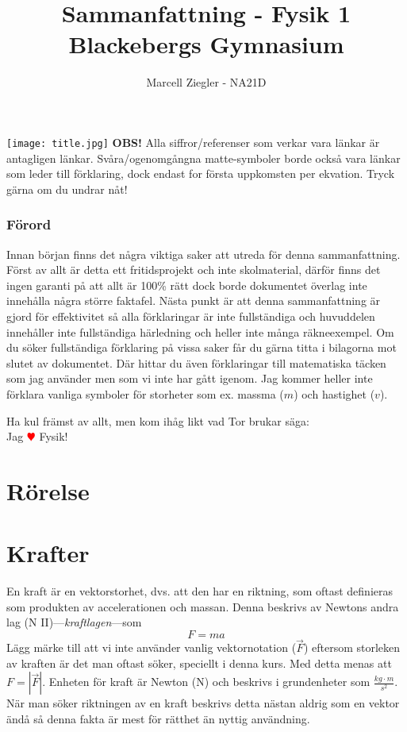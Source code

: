\documentclass[12pt, a4paper]{article}
\title{Sammanfattning - Fysik 1 \\ Blackebergs Gymnasium}
\author{Marcell Ziegler - NA21D}
\theoremstyle{definition}
\begin{document}
    \begin{titlepage}
        \maketitle
        \centering
        \vfill
        \texttt{[image: title.jpg]}
        \vfill
        \textbf{OBS!} Alla siffror/referenser som verkar vara länkar är antagligen länkar. Svåra/ogenomgångna matte-symboler borde också vara länkar som leder till förklaring, dock endast for första uppkomsten per ekvation. Tryck gärna om du undrar nåt!
    \end{titlepage}

    \tableofcontents

    \newpage

    \section*{Förord}
    Innan början finns det några viktiga saker att utreda för denna sammanfattning. Först av allt är detta ett fritidsprojekt och inte skolmaterial, därför finns det ingen garanti på att allt är 100\% rätt dock borde dokumentet överlag inte innehålla några större faktafel. Nästa punkt är att denna sammanfattning är gjord för effektivitet så alla förklaringar är inte fullständiga och huvuddelen innehåller inte fullständiga härledning och heller inte många räkneexempel. Om du söker fullständiga förklaring på vissa saker får du gärna titta i bilagorna mot slutet av dokumentet. Där hittar du även förklaringar till matematiska täcken som jag använder men som vi inte har gått igenom. Jag kommer heller inte förklara vanliga symboler för storheter som ex. massma ($m$) och hastighet ($v$).
    \begin{center}
        \large{Ha kul främst av allt, men kom ihåg likt vad Tor brukar säga:}\\
        \Large{Jag \textcolor{red}{$\varheartsuit$} Fysik!}
    \end{center}

    \part{Rörelse}
    

    \part{Krafter}
    En kraft är en vektorstorhet, dvs. att den har en riktning, som oftast definieras som produkten av accelerationen och massan. Denna beskrivs av Newtons andra lag (N II)---\emph{kraftlagen}---som
    \begin{equation*}
        F=ma
    \end{equation*}
    Lägg märke till att vi inte använder vanlig vektornotation ($\vec{F}$) eftersom storleken av kraften är det man oftast söker, speciellt i denna kurs. Med detta menas att $F = |\vec{F}|$. Enheten för kraft är Newton (N) och beskrivs i grundenheter som $\frac{kg \cdot m}{s^2}$. När man söker riktningen av en kraft beskrivs detta nästan aldrig som en vektor ändå så denna fakta är mest för rätthet än nyttig användning.
\end{document}
